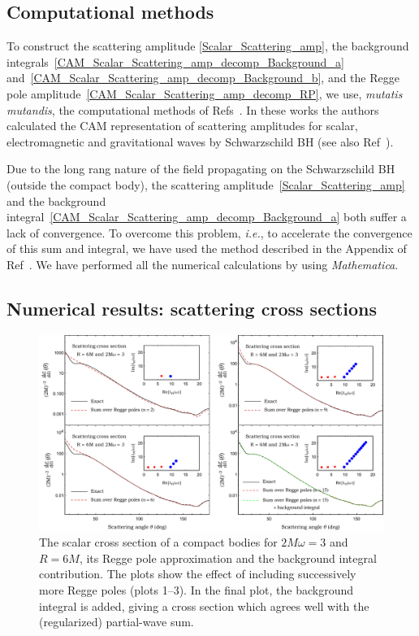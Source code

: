\documentclass[aps,prd,longbibliography,reprint,twocolumn,amsmath,amssymb,amsfonts,showpacs,footnote,superscriptaddress]{revtex4-1}%
\begin{document}
\subsection{Computational methods}
\label{SecIIIa}

To construct the scattering amplitude \eqref{Scalar_Scattering_amp}, the background integrals~\eqref{CAM_Scalar_Scattering_amp_decomp_Background_a} and~\eqref{CAM_Scalar_Scattering_amp_decomp_Background_b}, and the Regge pole amplitude~\eqref{CAM_Scalar_Scattering_amp_decomp_RP}, we use, \textit{mutatis mutandis}, the computational methods of Refs~\cite{Folacci:2019cmc,Folacci:2019vtt}. In these works the authors calculated the CAM representation of scattering amplitudes for scalar, electromagnetic and gravitational waves by Schwarzschild BH (see also Ref~\cite{Dolan:2017rtj}).

Due to the long rang nature of the field propagating on the Schwarzschild BH (outside the compact body), the scattering amplitude~\eqref{Scalar_Scattering_amp} and the background integral~\eqref{CAM_Scalar_Scattering_amp_decomp_Background_a} both suffer a lack of convergence. To overcome this problem, \textit{i.e.}, to accelerate the convergence of this sum and integral, we have used the method described in the Appendix of Ref~\cite{Folacci:2019cmc}. We have performed all the numerical calculations by using {\it Mathematica}. %


\subsection{Numerical results: scattering cross sections}
\label{subsec:results2}

\begin{figure}[htp!]
 \includegraphics[scale=0.50]{Scattering_Cross_Section_R_6_2Mw_3}
  \vspace*{-0.35cm}
\caption{\label{S_0_R_6_2Mw_3_Exact_vs_CAM} The scalar cross section of a compact bodies for $2M\omega=3$ and $R=6M$, its Regge pole approximation and the background integral contribution. The plots show the effect of including successively more Regge poles (plots 1--3). In the final plot, the background integral is added, giving a cross section which agrees well with the (regularized) partial-wave sum.}
\end{figure}
\end{document}
